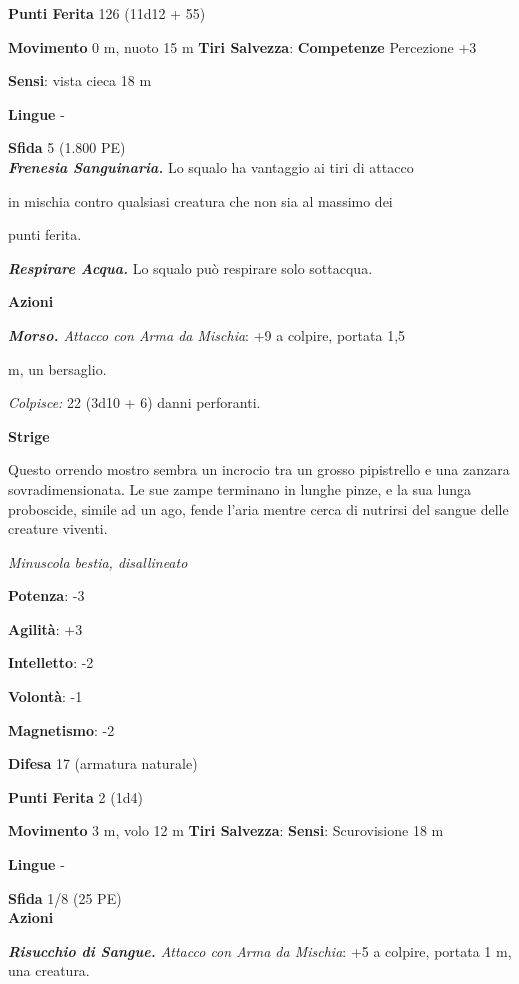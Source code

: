 \begin{multicols}{2}
\textbf{Punti Ferita} 126 (11d12 + 55)

\textbf{Movimento} 0 m, nuoto 15 m
\textbf{Tiri Salvezza}:
\textbf{Competenze} Percezione +3

\textbf{Sensi}: vista cieca 18 m

\textbf{Lingue} -

\textbf{Sfida} 5 (1.800 PE)\smallskip\\

\emph{\textbf{Frenesia Sanguinaria.}} Lo squalo ha vantaggio ai tiri di
attacco

in mischia contro qualsiasi creatura che non sia al massimo dei

punti ferita.

\emph{\textbf{Respirare Acqua.}} Lo squalo può respirare solo sottacqua.

\smallskip\textbf{Azioni}

\emph{\textbf{Morso.} Attacco con Arma da Mischia}: +9 a colpire,
portata 1,5

m, un bersaglio.

\emph{Colpisce:} 22 (3d10 + 6) danni perforanti.



\textbf{Strige}

Questo orrendo mostro sembra un incrocio tra un grosso pipistrello e una
zanzara sovradimensionata. Le sue zampe terminano in lunghe pinze, e la
sua lunga proboscide, simile ad un ago, fende l'aria mentre cerca di
nutrirsi del sangue delle creature viventi.

\emph{Minuscola bestia, disallineato}

\textbf{Potenza}: -3

\textbf{Agilità}: +3

\textbf{Intelletto}: -2

\textbf{Volontà}: -1

\textbf{Magnetismo}: -2

\textbf{Difesa} 17 (armatura naturale)

\textbf{Punti Ferita} 2 (1d4)

\textbf{Movimento} 3 m, volo 12 m
\textbf{Tiri Salvezza}:
\textbf{Sensi}: Scurovisione 18 m

\textbf{Lingue} -

\textbf{Sfida} 1/8 (25 PE)\smallskip\\

\smallskip\textbf{Azioni}

\emph{\textbf{Risucchio di Sangue.} Attacco con Arma da Mischia}: +5 a
colpire, portata 1 m, una creatura.


\end{multicols}

